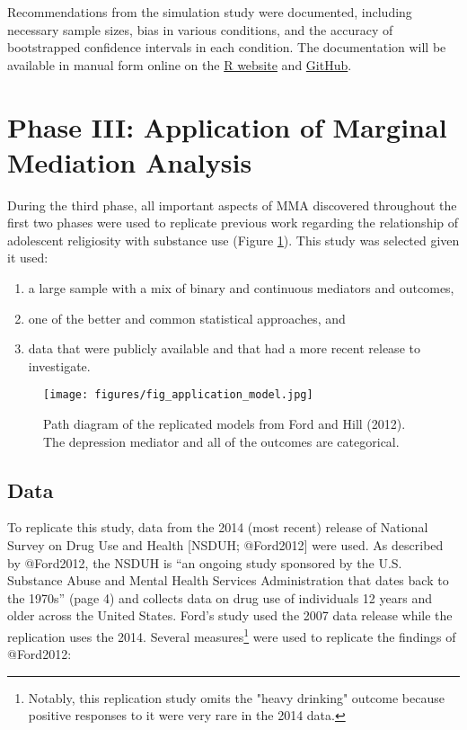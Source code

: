 \documentclass[]{article}
\providecommand{\tightlist}{%
  \setlength{\itemsep}{0pt}\setlength{\parskip}{0pt}}
\let\rmarkdownfootnote\footnote%
\def\footnote{\protect\rmarkdownfootnote}
\begin{document}
Recommendations from the simulation study were documented, including
necessary sample sizes, bias in various conditions, and the accuracy of
bootstrapped confidence intervals in each condition. The documentation
will be available in manual form online on the
\href{http://www.r-project.org}{R website} and
\href{github.com}{GitHub}.

\section{Phase III: Application of Marginal Mediation
Analysis}\label{phase-iii-application-of-marginal-mediation-analysis}

During the third phase, all important aspects of MMA discovered
throughout the first two phases were used to replicate previous work
regarding the relationship of adolescent religiosity with substance use
(Figure \ref{fig:theorymed}). This study was selected given it used:

\begin{enumerate}
\def\labelenumi{\arabic{enumi}.}
\tightlist
\item
  a large sample with a mix of binary and continuous mediators and
  outcomes,
\item
  one of the better and common statistical approaches, and
\item
  data that were publicly available and that had a more recent release
  to investigate.
\end{enumerate}

\begin{figure}[tb]
  \texttt{[image: figures/fig\_application\_model.jpg]}
  \caption{Path diagram of the replicated models from Ford and Hill (2012). The depression mediator and all of the outcomes are categorical.}
  \label{fig:theorymed}
\end{figure}

\subsection{Data}\label{data}

To replicate this study, data from the 2014 (most recent) release of
National Survey on Drug Use and Health {[}NSDUH; @Ford2012{]} were used.
As described by @Ford2012, the NSDUH is ``an ongoing study sponsored by
the U.S. Substance Abuse and Mental Health Services Administration that
dates back to the 1970s'' (page 4) and collects data on drug use of
individuals 12 years and older across the United States. Ford's study
used the 2007 data release while the replication uses the 2014. Several
measures\footnote{Notably, this replication study omits the "heavy drinking" outcome because positive responses to it were very rare in the 2014 data.}
were used to replicate the findings of @Ford2012:
\end{document}
